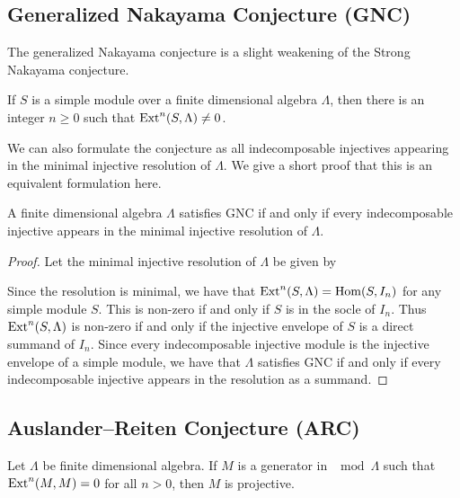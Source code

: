 \subsection*{Generalized Nakayama Conjecture (GNC)}
The generalized Nakayama conjecture is a slight weakening of the Strong Nakayama conjecture.

\begin{conj} 
	If $S$ is a simple module over a finite dimensional algebra $\Lambda$, then there is an integer $n \geq 0$ such that $\operatorname{Ext}^n(S, \Lambda) \neq 0$. 
\end{conj}

We can also formulate the conjecture as all indecomposable injectives appearing in the minimal injective resolution of $\Lambda$. We give a short proof that this is an equivalent formulation here.

\begin{prop}\label{prop:GNC_reformulated}
	A finite dimensional algebra $\Lambda$ satisfies GNC if and only if every indecomposable injective appears in the minimal injective resolution of $\Lambda$.
	\begin{proof}
		Let the minimal injective resolution of $\Lambda$ be given by 
		\begin{center}
		\end{center}
		Since the resolution is minimal, we have that $\operatorname{Ext}^n(S, \Lambda) = \operatorname{Hom}(S, I_n)$ for any simple module $S$. This is non-zero if and only if $S$ is in the socle of $I_n$. Thus $\operatorname{Ext}^n(S, \Lambda)$ is non-zero if and only if the injective envelope of $S$ is a direct summand of $I_n$. Since every indecomposable injective module is the injective envelope of a simple module, we have that $\Lambda$ satisfies GNC if and only if every indecomposable injective appears in the resolution as a summand.
	\end{proof}
\end{prop}

\subsection*{Auslander--Reiten Conjecture (ARC)}
\begin{conj} 
	Let $\Lambda$ be  finite dimensional algebra. If $M$ is a generator in $\mod\Lambda$ such that  $\operatorname{Ext}^n(M, M) = 0$ for all $n > 0$, then $M$ is projective. 
\end{conj}

